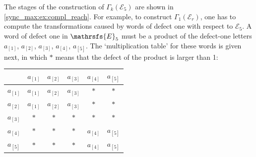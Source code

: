 The stages of the construction of $\Gamma_k(\mathcal E_5)$ are shown in \cref{sync_max:ex:compl_reach}. For example, to construct 
$\Gamma_1(\mathcal E_r)$, one has to compute the transformations caused by words of defect one with respect to $\mathcal{E}_5$.
A word of defect one in $\mathrsfs{E}_5$ must be a product of the defect-one letters $a_{[1]}$, $a_{[2]}$, $a_{[3]}$, $a_{[4]}$, $a_{[5]}$. The `multiplication table' for these words is given next, in which $*$ means that the defect of the product is larger than 1:
\begin{center}
	\begin{tabular}{ c| c | c | c | c | c |}
		& $a_{[1]}$ & $a_{[2]}$ & $a_{[3]}$ & $a_{[4]}$ & $a_{[5]}$ \\
		\hline
		$a_{[1]}$ & $a_{[1]}$ & $a_{[2]}$  & $a_{[3]}$ & $*$ & $*$\\
		\hline
		$a_{[2]}$ & $a_{[1]}$ & $a_{[2]}$  & $a_{[3]}$ & $*$ & $*$\\
		\hline
		$a_{[3]}$ & $*$ & $*$  & $*$ & $*$ & $*$\\
		\hline
		$a_{[4]}$ & $*$ & $*$  & $*$ & $a_{[4]}$ & $a_{[5]}$\\
		\hline
		$a_{[5]}$ & $*$ & $*$  & $*$ & $a_{[4]}$ & $a_{[5]}$\\
		\hline
	\end{tabular}
\end{center}

